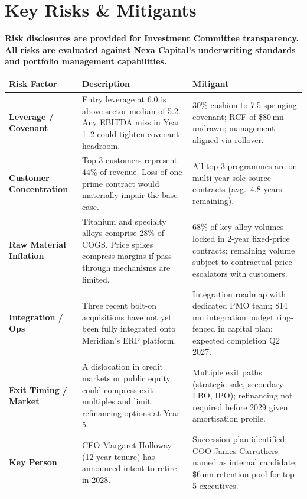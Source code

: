 
\section{Key Risks \& Mitigants}

\begin{tcolorbox}[riskbox]
  \small\color{AlertRed}\bfseries
  Risk disclosures are provided for Investment Committee transparency. All risks are evaluated
  against Nexa Capital's underwriting standards and portfolio management capabilities.
\end{tcolorbox}

\vspace{8pt}

\noindent
\begin{tabularx}{\linewidth}{p{3.5cm}Xp{4.5cm}}
  \toprule
  \rowcolor{NavyDark}
  \color{white}\textbf{Risk Factor} &
  \color{white}\textbf{Description} &
  \color{white}\textbf{Mitigant} \\
  \midrule
  \rowcolor{IceBlue}
  \textbf{Leverage / Covenant} &
    Entry leverage at 6.0\texttimes{} is above sector median of 5.2\texttimes{}.
    Any EBITDA miss in Year 1--2 could tighten covenant headroom. &
    30\% cushion to 7.5\texttimes{} springing covenant; RCF of \$80\,mn undrawn; management aligned via rollover. \\
  \textbf{Customer Concentration} &
    Top-3 customers represent 44\% of revenue. Loss of one prime contract would
    materially impair the base case. &
    All top-3 programmes are on multi-year sole-source contracts (avg.\ 4.8 years remaining). \\
  \rowcolor{IceBlue}
  \textbf{Raw Material Inflation} &
    Titanium and specialty alloys comprise 28\% of COGS. Price spikes compress
    margins if pass-through mechanisms are limited. &
    68\% of key alloy volumes locked in 2-year fixed-price contracts; remaining volume
    subject to contractual price escalators with customers. \\
  \textbf{Integration / Ops} &
    Three recent bolt-on acquisitions have not yet been fully integrated onto
    Meridian's ERP platform. &
    Integration roadmap with dedicated PMO team; \$14\,mn integration budget
    ring-fenced in capital plan; expected completion Q2 2027. \\
  \rowcolor{IceBlue}
  \textbf{Exit Timing / Market} &
    A dislocation in credit markets or public equity could compress exit multiples
    and limit refinancing options at Year 5. &
    Multiple exit paths (strategic sale, secondary LBO, IPO); refinancing not required
    before 2029 given amortisation profile. \\
  \textbf{Key Person} &
    CEO Margaret Holloway (12-year tenure) has announced intent to retire in 2028. &
    Succession plan identified; COO James Carruthers named as internal candidate;
    \$6\,mn retention pool for top-5 executives. \\
  \bottomrule
\end{tabularx}
